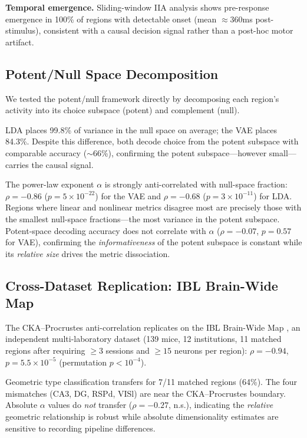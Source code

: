 \documentclass{article}
\begin{document}
\textbf{Temporal emergence.} Sliding-window IIA analysis shows pre-response emergence in 100\% of regions with detectable onset (mean $\approx 360$ms post-stimulus), consistent with a causal decision signal rather than a post-hoc motor artifact.


\subsection{Potent/Null Space Decomposition}
\label{sec:potent_null}

We tested the potent/null framework \citep{kaufman2014cortical} directly by decomposing each region's activity into its choice subspace (potent) and complement (null).

LDA places 99.8\% of variance in the null space on average; the VAE places 84.3\%. Despite this difference, both decode choice from the potent subspace with comparable accuracy ($\sim$66\%), confirming the potent subspace---however small---carries the causal signal.

The power-law exponent $\alpha$ is strongly anti-correlated with null-space fraction: $\rho = -0.86$ ($p = 5 \times 10^{-22}$) for the VAE and $\rho = -0.68$ ($p = 3 \times 10^{-11}$) for LDA. Regions where linear and nonlinear metrics disagree most are precisely those with the smallest null-space fractions---the most variance in the potent subspace. Potent-space decoding accuracy does not correlate with $\alpha$ ($\rho = -0.07$, $p = 0.57$ for VAE), confirming the \emph{informativeness} of the potent subspace is constant while its \emph{relative size} drives the metric dissociation.


\subsection{Cross-Dataset Replication: IBL Brain-Wide Map}
\label{sec:ibl}

The CKA--Procrustes anti-correlation replicates on the IBL Brain-Wide Map \citep{ibl2025brainwide}, an independent multi-laboratory dataset (139 mice, 12 institutions, 11 matched regions after requiring $\geq 3$ sessions and $\geq 15$ neurons per region): $\rho = -0.94$, $p = 5.5 \times 10^{-5}$ (permutation $p < 10^{-4}$).

Geometric type classification transfers for 7/11 matched regions (64\%). The four mismatches (CA3, DG, RSPd, VISl) are near the CKA--Procrustes boundary. Absolute $\alpha$ values do \emph{not} transfer ($\rho = -0.27$, n.s.), indicating the \emph{relative} geometric relationship is robust while absolute dimensionality estimates are sensitive to recording pipeline differences.
\end{document}
